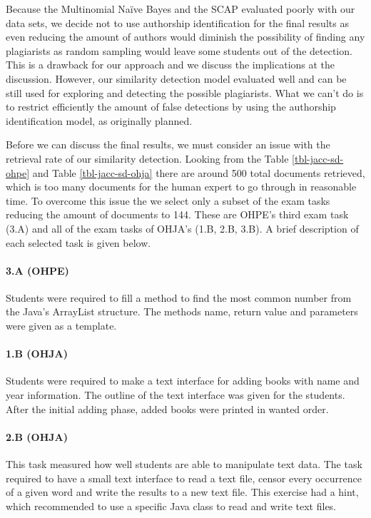 Because the Multinomial Naïve Bayes and the SCAP evaluated poorly with our data sets, we decide not to use authorship identification for the final results as even reducing the amount of authors would diminish the possibility of finding any plagiarists as random sampling would leave some students out of the detection. This is a drawback for our approach and we discuss the implications at the discussion. However, our similarity detection model evaluated well and can be still used for exploring and detecting the possible plagiarists. What we can't do is to restrict efficiently the amount of false detections by using the authorship identification model, as originally planned.

Before we can discuss the final results, we must consider an issue with the retrieval rate of our similarity detection. Looking from the Table \ref{tbl-jacc-sd-ohpe} and Table \ref{tbl-jacc-sd-ohja} there are around 500 total documents retrieved, which is too many documents for the human expert to go through in reasonable time. To overcome this issue the we select only a subset of the exam tasks reducing the amount of documents to 144. These are OHPE's third exam task (3.A) and all of the exam tasks of OHJA's (1.B, 2.B, 3.B). A brief description of each selected task is given below.

\paragraph{3.A (OHPE)} Students were required to fill a method to find the most common number from the Java's ArrayList structure. The methods name, return value and parameters were given as a template. 

\paragraph{1.B (OHJA)} Students were required to make a text interface for adding books with name and year information. The outline of the text interface was given for the students. After the initial adding phase, added books were printed in wanted order.

\paragraph{2.B (OHJA)} This task measured how well students are able to manipulate text data. The task required to have a small text interface to read a text file, censor every occurrence of a given word and write the results to a new text file. This exercise had a hint, which recommended to use a specific Java class to read and write text files. 

